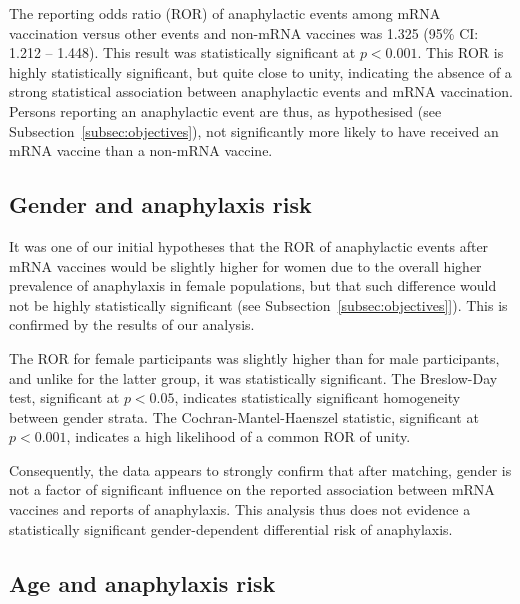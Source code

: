 \documentclass{article}
\begin{document}
The reporting odds ratio (ROR) of anaphylactic events among mRNA vaccination versus other events and non-mRNA vaccines was 1.325 (95\% CI: 1.212 -- 1.448).
This result was statistically significant at $p < 0.001$.
This ROR is highly statistically significant, but quite close to unity, indicating the absence of a strong statistical association between anaphylactic events and mRNA vaccination.
Persons reporting an anaphylactic event are thus, as hypothesised (see Subsection~\ref{subsec:objectives}), not significantly more likely to have received an mRNA vaccine than a non-mRNA vaccine.

\subsection{Gender and anaphylaxis risk}

It was one of our initial hypotheses that the ROR of anaphylactic events after mRNA vaccines would be slightly higher for women due to the overall higher prevalence of anaphylaxis in female populations, but that such difference would not be highly statistically significant (see Subsection~\ref{subsec:objectives}]).
This is confirmed by the results of our analysis.

The ROR for female participants was slightly higher than for male participants, and unlike for the latter group, it was statistically significant.
The Breslow-Day test, significant at $p < 0.05$, indicates statistically significant homogeneity between gender strata.
The Cochran-Mantel-Haenszel statistic, significant at $p < 0.001$, indicates a high likelihood of a common ROR of unity.

Consequently, the data appears to strongly confirm that after matching, gender is not a factor of significant influence on the reported association between mRNA vaccines and reports of anaphylaxis.
This analysis thus does not evidence a statistically significant gender-dependent differential risk of anaphylaxis.

\subsection{Age and anaphylaxis risk}
\end{document}
